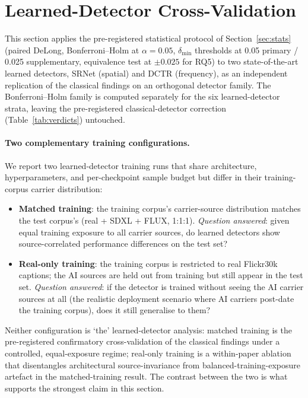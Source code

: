 \documentclass[10pt,twocolumn,a4paper]{article}
\begin{document}
\section{Learned-Detector Cross-Validation}
\label{sec:learnedxval}

This section applies the pre-registered statistical protocol of Section~\ref{sec:stats} (paired DeLong, Bonferroni--Holm at $\alpha\!=\!0.05$, $\delta_\text{min}$ thresholds at 0.05 primary / 0.025 supplementary, equivalence test at $\pm 0.025$ for RQ5) to two state-of-the-art learned detectors, SRNet (spatial) and DCTR (frequency), as an independent replication of the classical findings on an orthogonal detector family. The Bonferroni--Holm family is computed separately for the six learned-detector strata, leaving the pre-registered classical-detector correction (Table~\ref{tab:verdicts}) untouched.

\paragraph{Two complementary training configurations.} We report two learned-detector training runs that share architecture, hyperparameters, and per-checkpoint sample budget but differ in their training-corpus carrier distribution:

\begin{itemize}
\item \textbf{Matched training}: the training corpus's carrier-source distribution matches the test corpus's (real + SDXL + FLUX, 1:1:1). \emph{Question answered}: given equal training exposure to all carrier sources, do learned detectors show source-correlated performance differences on the test set?
\item \textbf{Real-only training}: the training corpus is restricted to real Flickr30k captions; the AI sources are held out from training but still appear in the test set. \emph{Question answered}: if the detector is trained without seeing the AI carrier sources at all (the realistic deployment scenario where AI carriers post-date the training corpus), does it still generalise to them?
\end{itemize}

\noindent Neither configuration is `the' learned-detector analysis: matched training is the pre-registered confirmatory cross-validation of the classical findings under a controlled, equal-exposure regime; real-only training is a within-paper ablation that disentangles architectural source-invariance from balanced-training-exposure artefact in the matched-training result. The contrast between the two is what supports the strongest claim in this section.
\end{document}
